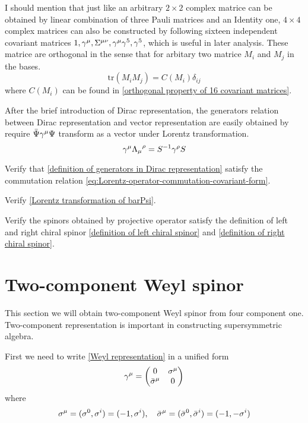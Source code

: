 I should mention that just like an arbitrary $2\times2$ complex matrice can be obtained by linear combination of three Pauli matrices and an Identity one, $4\times4$ complex matrices can also be constructed by following sixteen independent covariant matrices $1,\gamma^{\mu},\Sigma^{\mu\nu},\gamma^{\mu}\gamma^5,\gamma^5$, which is useful in later analysis. These matrice are orthogonal in the sense that for arbitary two matrice $M_i$ and $M_j$ in the bases.  
\begin{equation}
\text{tr}(M_i M_j) = C(M_i)\delta_{ij}
\end{equation}
where $C(M_i)$ can be found in \eqref{orthogonal property of 16 covariant matrices}.

After the brief introduction of Dirac representation, the generators relation between Dirac representation and vector representation are easily obtained by require $\bar{\Psi}\gamma^{\mu}\Psi$ transform as a vector under Lorentz transformation.
\begin{equation} \label{Lorentz transformation of gamma matrice}
\gamma^{\mu}{\Lambda_{\mu}}^{\rho}=S^{-1}\gamma^{\rho}S
\end{equation}

\begin{Exe}
Verify that \eqref{definition of generators in Dirac representation} satisfy the commutation relation \eqref{eq:Lorentz-operator-commutation-covariant-form}.
\end{Exe}
\begin{Exe}
Verify \eqref{Lorentz transformation of barPsi}.
\end{Exe}

\begin{Exe}
Verify the spinors obtained by projective operator satisfy the definition of left and right chiral spinor \eqref{definition of left chiral spinor} and
  \eqref{definition of right chiral spinor}.
\end{Exe}


\section{Two-component Weyl spinor}
This section we will obtain two-component Weyl spinor from four component one. Two-component representation is important in constructing supersymmetric algebra.

First we need to write \eqref{Weyl representation} in a unified form
\begin{equation} \label{unified form of gamma matrice}
\g^{\m} =\mqty( 0            & \s^{\m}\\
\bar{\s}^{\m}& 0     )
\end{equation}
where
\begin{equation}
  \sigma^{\mu} = (\sigma^0,\sigma^i) = (-1,\sigma^{i}),\quad
\bar{\sigma}^{\mu}=(\bar{\sigma}^0,\bar{\sigma}^i)=(-1,-\sigma^{i})
\end{equation}

